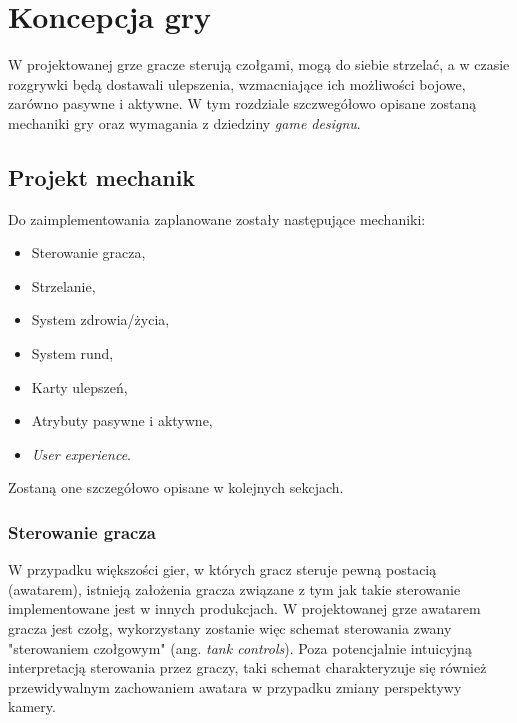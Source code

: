 \chapter{Koncepcja gry}
\cite{game_engine_architecture}
W projektowanej grze gracze sterują czołgami, mogą do siebie strzelać, a w czasie rozgrywki będą dostawali ulepszenia, wzmacniające ich możliwości bojowe, zarówno pasywne i aktywne.
W tym rozdziale szczwegółowo opisane zostaną mechaniki gry oraz wymagania z dziedziny \emph{game designu}.

\section{Projekt mechanik}

Do zaimplementowania zaplanowane zostały następujące mechaniki:

\begin{itemize}
    \item Sterowanie gracza,
    \item Strzelanie,
    \item System zdrowia/życia,
    \item System rund,
    \item Karty ulepszeń,
    \item Atrybuty pasywne i aktywne,
    \item \emph{User experience}.
\end{itemize}

Zostaną one szczegółowo opisane w kolejnych sekcjach.



\subsection{Sterowanie gracza}\label{sec:steering_concept}

W przypadku większości gier, w których gracz steruje pewną postacią (awatarem), istnieją założenia gracza związane z tym jak takie sterowanie implementowane jest w innych produkcjach.
W projektowanej grze awatarem gracza jest czołg, wykorzystany zostanie więc schemat sterowania zwany "sterowaniem czołgowym" (ang. \emph{tank controls}). \cite{horror_tank_controls}
Poza potencjalnie intuicyjną interpretacją sterowania przez graczy, taki schemat charakteryzuje się również przewidywalnym zachowaniem awatara w przypadku zmiany perspektywy kamery.

